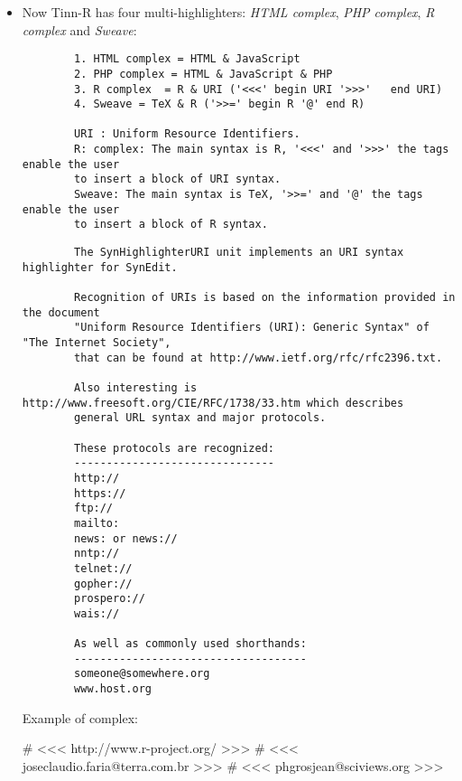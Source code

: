\begin{itemize}
  \item Now Tinn-R has four multi-highlighters: \textit{HTML complex},
    \textit{PHP complex}, \textit{R complex} and \textit{Sweave}:


    \begin{footnotesize}
      \begin{verbatim}
        1. HTML complex = HTML & JavaScript
        2. PHP complex = HTML & JavaScript & PHP
        3. R complex  = R & URI ('<<<' begin URI '>>>'   end URI)
        4. Sweave = TeX & R ('>>=' begin R '@' end R)

        URI : Uniform Resource Identifiers.
        R: complex: The main syntax is R, '<<<' and '>>>' the tags enable the user
        to insert a block of URI syntax.
        Sweave: The main syntax is TeX, '>>=' and '@' the tags enable the user
        to insert a block of R syntax.
      \end{verbatim}
    \end{footnotesize}

    \begin{footnotesize}
      \begin{verbatim}
        The SynHighlighterURI unit implements an URI syntax highlighter for SynEdit.

        Recognition of URIs is based on the information provided in the document
        "Uniform Resource Identifiers (URI): Generic Syntax" of "The Internet Society",
        that can be found at http://www.ietf.org/rfc/rfc2396.txt.

        Also interesting is http://www.freesoft.org/CIE/RFC/1738/33.htm which describes
        general URL syntax and major protocols.

        These protocols are recognized:
        -------------------------------
        http://
        https://
        ftp://
        mailto:
        news: or news://
        nntp://
        telnet://
        gopher://
        prospero://
        wais://

        As well as commonly used shorthands:
        ------------------------------------
        someone@somewhere.org
        www.host.org

      \end{verbatim}
    \end{footnotesize}

    Example of \RR{} complex:

    \begin{Scode}
      # <<< http://www.r-project.org/ >>>
      # <<< joseclaudio.faria@terra.com.br >>>
      # <<< phgrosjean@sciviews.org >>>


\end{Scode}
\end{itemize}
